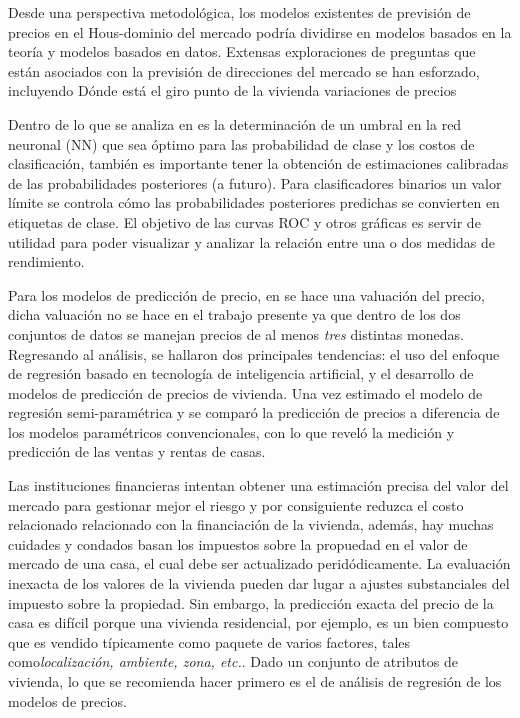 \documentclass[a4paper,12pt]{article}
\begin{document}
Desde una perspectiva metodológica, los modelos existentes de previsión de precios en el Hous-dominio del mercado podría dividirse 
en modelos basados en la teoría y modelos basados en datos. Extensas exploraciones de preguntas que
están asociados con la previsión de direcciones del mercado se han esforzado, incluyendo Dónde está el giro punto de la vivienda 
variaciones de precios
\vspace{5mm}

Dentro de lo que se analiza en \cite{cortes1995support} es la determinación de un umbral en la red neuronal (NN) que sea óptimo 
para las probabilidad de clase y los costos de clasificación, también es importante tener la obtención de estimaciones calibradas 
de  las probabilidades posteriores (a futuro). Para clasificadores binarios un valor límite se controla cómo las probabilidades 
posteriores predichas se convierten en etiquetas de clase. El objetivo de las curvas ROC y otros gráficas es servir de utilidad  
para poder visualizar y analizar la relación entre una o dos medidas de rendimiento.\\
\vspace{5mm}

Para los modelos de predicción de precio, en \cite{park2015using} se hace una valuación del precio, dicha valuación no se hace en 
el trabajo presente ya que dentro de los dos conjuntos de datos se manejan precios de al menos \textit{tres} distintas monedas. 
Regresando al análisis, se hallaron dos principales tendencias: el uso del enfoque de  regresión basado en tecnología de 
inteligencia artificial, y el desarrollo de modelos de predicción de precios de vivienda. Una vez estimado el modelo de regresión 
semi-paramétrica y se comparó la predicción de precios a diferencia  de los modelos paramétricos convencionales, con lo que 
reveló la medición y predicción de las ventas y rentas de casas.
\vspace{5mm}

Las instituciones financieras intentan obtener una estimación precisa del valor del mercado para gestionar mejor el riesgo y por 
consiguiente reduzca el costo relacionado relacionado con la financiación de la vivienda, además, hay muchas cuidades y condados 
basan los impuestos  sobre la propuedad en el valor de mercado de una casa, el cual debe ser actualizado peridódicamente. La 
evaluación inexacta de los valores de la vivienda pueden dar lugar a ajustes substanciales del impuesto sobre la propiedad. Sin 
embargo, la predicción exacta del precio de la casa es difícil porque una vivienda residencial, por ejemplo, es un bien compuesto 
que es vendido típicamente como paquete de varios factores, tales como\textit{localización, ambiente, zona, etc.}. Dado un 
conjunto de atributos de vivienda, lo que se recomienda hacer primero es el de análisis de regresión de los modelos de 
precios\cite{bin2004prediction}.
\vspace{5mm}
\end{document}
